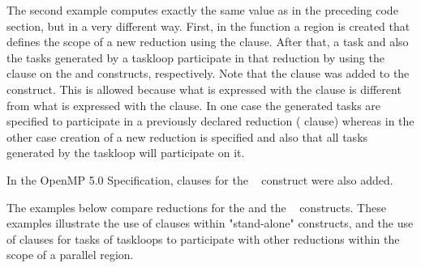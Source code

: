 
The second example computes exactly the same value as in the preceding code section,
but in a very different way.
First, in the  function a  region is created 
that defines the scope of a new reduction using the  clause.
After that, a task and also the tasks generated by a taskloop participate in 
that reduction by using the  clause on the 
and  constructs, respectively. 
Note that the  clause was added to the  construct.
This is allowed because what is expressed with the  clause
is different from what is expressed with the  clause.
In one case the generated tasks are specified to participate in a previously 
declared reduction ( clause) whereas in the other case
creation of a new reduction is specified and also that all tasks generated 
by the taskloop will participate on it.

\clearpage

In the OpenMP 5.0 Specification,  clauses for the
~ construct were also added. 

The examples below compare reductions for the  and the ~ constructs.
These examples illustrate the use of  clauses within 
"stand-alone"  constructs, and the use of  clauses for tasks of taskloops to participate
with other reductions within the scope of a parallel region.

